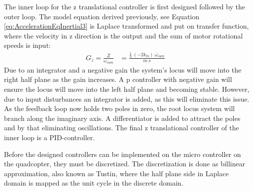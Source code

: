 The inner loop for the z translational controller is first designed followed by the outer loop.
The model equation derived previously, see Equation \ref{eq:AccelerationEqInertial3} is Laplace transformed and put on transfer function, where the velocity in z direction is the output and the sum of motor rotational speeds is input:
\begin{align}
G_{\dot{z}}=\frac{\dot{Z}}{\omega_{sum}} &= \frac{ \frac{1}{4}\ (-2 k_{th})\ \overline{\omega}_{sum} }{ m\ s } & \label{eq:linearTransferFunctionZ}
\end{align}
Due to an integrator and a negative gain the system's locus will move into the right half plane as the gain increases.
A p controller with negative gain will ensure the locus will move into the left half plane and becoming stable. However, due to input disturbances an integrator is added, as this will eliminate this issue. As the feedback loop now holds two poles in zero, the root locus system will branch along the imaginary axis. A differentiator is added to attract the poles and by that eliminating oscillations. The final z translational controller of the inner loop is a PID-controller. 

Before the designed controllers can be implemented on the micro controller on the quadcopter, they must be discretized. 
The discretization is done as billinear approximation, also known as Tustin, where the half plane side in Laplace domain is mapped as the unit cycle in the discrete domain. 
